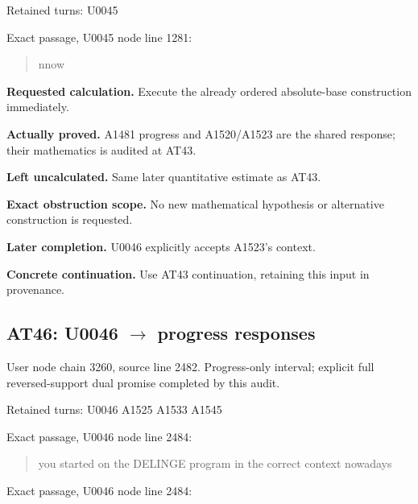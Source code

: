 Retained turns: U0045
\protect{}

Exact passage, U0045 node
\protect{} line 1281:

\begin{quote}
nnow
\end{quote}

\textbf{Requested calculation.} Execute the already ordered
absolute-base construction immediately.

\textbf{Actually proved.} A1481 progress and A1520/A1523 are the shared
response; their mathematics is audited at AT43.

\textbf{Left uncalculated.} Same later quantitative estimate as AT43.

\textbf{Exact obstruction scope.} No new mathematical hypothesis or
alternative construction is requested.

\textbf{Later completion.} U0046 explicitly accepts A1523's context.

\textbf{Concrete continuation.} Use AT43 continuation, retaining this
input in provenance.

\subsection{\texorpdfstring{AT46: U0046
\allowbreak{}\ensuremath{→}\allowbreak{} progress
responses}{AT46: U0046  progress responses}}\label{TranscriptLedgerStage:at46-u0046-progress-responses}

User node \protect{} chain
3260, source line 2482. Progress-only interval; explicit full
reversed-support dual promise completed by this audit.

Retained turns: U0046
\protect{} A1525
\protect{} A1533
\protect{} A1545
\protect{}

Exact passage, U0046 node
\protect{} line 2484:

\begin{quote}
you started on the DELINGE program in the correct context nowadays
\end{quote}

Exact passage, U0046 node
\protect{} line 2484:

